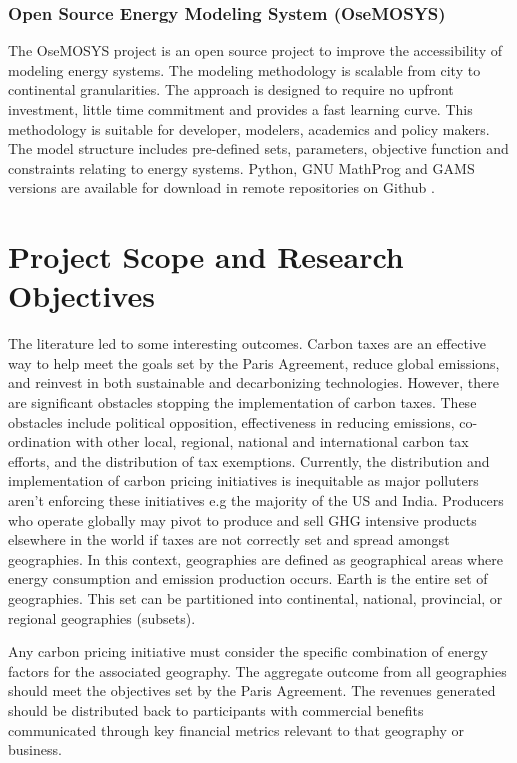 \documentclass[12pt]{article}
\begin{document}
\subsubsection{Open Source Energy Modeling System (OseMOSYS)}
The OseMOSYS project is an open source project to improve the accessibility of modeling energy systems.
The modeling methodology is scalable from city to continental granularities. The approach is designed to require no upfront investment,
little time commitment and provides a fast learning curve. This methodology is suitable for developer, modelers, academics and policy makers.
The model structure includes pre-defined sets, parameters, objective function and constraints relating to energy systems. 
Python, GNU MathProg and GAMS versions are available
for download in remote repositories on Github \cite{W:13}.
\newpage

\section{Project Scope and Research Objectives}
The literature led to some interesting outcomes. 
Carbon taxes are an effective way to help meet the goals set by the Paris Agreement, reduce global emissions, and reinvest in both sustainable and decarbonizing technologies.
However, there are significant obstacles stopping the implementation of carbon taxes. 
These obstacles include political opposition, effectiveness in reducing emissions, co-ordination with other local, regional, national and international carbon tax efforts, and the distribution of tax exemptions.
Currently, the distribution and implementation of carbon pricing initiatives is inequitable as major polluters aren't enforcing these initiatives e.g the majority of the US and India.
Producers who operate globally may pivot to produce and sell GHG intensive products elsewhere in the world if taxes are not correctly set and spread amongst geographies.
In this context, geographies are defined as geographical areas where energy consumption and emission production occurs. 
Earth is the entire set of geographies.
This set can be partitioned into continental, national, provincial, or regional geographies (subsets).


Any carbon pricing initiative must consider the specific combination of energy factors for the associated geography.
The aggregate outcome from all geographies should meet the objectives set by the Paris Agreement.
The revenues generated should be distributed back to participants with commercial benefits communicated through key financial metrics relevant to that geography or business.
\end{document}
